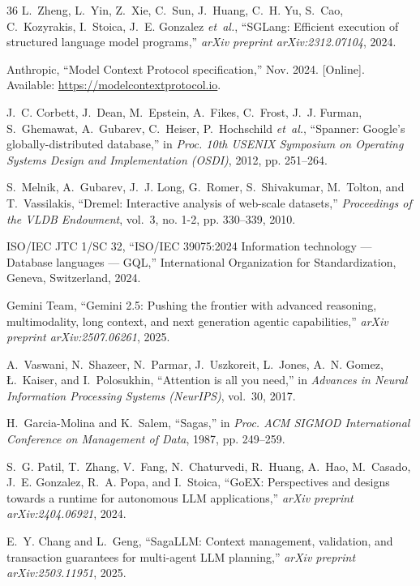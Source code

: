 \documentclass[10pt,conference]{IEEEtran}
\begin{document}
\begin{thebibliography}{36}
L.~Zheng, L.~Yin, Z.~Xie, C.~Sun, J.~Huang, C.~H. Yu, S.~Cao, C.~Kozyrakis, I.~Stoica, J.~E. Gonzalez \emph{et~al.}, ``{SGLang}: Efficient execution of structured language model programs,'' \emph{arXiv preprint arXiv:2312.07104}, 2024.

Anthropic, ``Model Context Protocol specification,'' Nov. 2024. [Online]. Available: \url{https://modelcontextprotocol.io}.

J.~C. Corbett, J.~Dean, M.~Epstein, A.~Fikes, C.~Frost, J.~J. Furman, S.~Ghemawat, A.~Gubarev, C.~Heiser, P.~Hochschild \emph{et~al.}, ``Spanner: {Google's} globally-distributed database,'' in \emph{Proc. 10th USENIX Symposium on Operating Systems Design and Implementation (OSDI)}, 2012, pp. 251--264.

S.~Melnik, A.~Gubarev, J.~J. Long, G.~Romer, S.~Shivakumar, M.~Tolton, and T.~Vassilakis, ``Dremel: Interactive analysis of web-scale datasets,'' \emph{Proceedings of the VLDB Endowment}, vol.~3, no. 1-2, pp. 330--339, 2010.

{ISO/IEC JTC 1/SC 32}, ``{ISO/IEC 39075:2024} Information technology --- Database languages --- {GQL},'' International Organization for Standardization, Geneva, Switzerland, 2024.

{Gemini Team}, ``Gemini 2.5: Pushing the frontier with advanced reasoning, multimodality, long context, and next generation agentic capabilities,'' \emph{arXiv preprint arXiv:2507.06261}, 2025.

A.~Vaswani, N.~Shazeer, N.~Parmar, J.~Uszkoreit, L.~Jones, A.~N. Gomez, {\L}.~Kaiser, and I.~Polosukhin, ``Attention is all you need,'' in \emph{Advances in Neural Information Processing Systems (NeurIPS)}, vol.~30, 2017.

H.~Garcia-Molina and K.~Salem, ``Sagas,'' in \emph{Proc. ACM SIGMOD International Conference on Management of Data}, 1987, pp. 249--259.

S.~G. Patil, T.~Zhang, V.~Fang, N.~Chaturvedi, R.~Huang, A.~Hao, M.~Casado, J.~E. Gonzalez, R.~A. Popa, and I.~Stoica, ``{GoEX}: Perspectives and designs towards a runtime for autonomous {LLM} applications,'' \emph{arXiv preprint arXiv:2404.06921}, 2024.

E.~Y. Chang and L.~Geng, ``{SagaLLM}: Context management, validation, and transaction guarantees for multi-agent {LLM} planning,'' \emph{arXiv preprint arXiv:2503.11951}, 2025.


\end{thebibliography}
\end{document}
